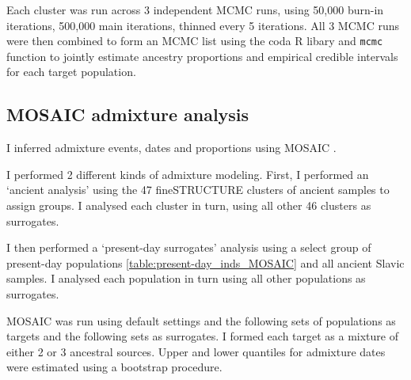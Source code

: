 Each cluster was run across 3 independent MCMC runs, using 50,000 burn-in iterations, 500,000 main iterations, thinned every 5 iterations. All 3 MCMC runs were then combined to form an MCMC list using the coda R libary \cite{oro22547} and \texttt{mcmc} function to jointly estimate ancestry proportions and empirical credible intervals for each target population. 

\subsection{MOSAIC admixture analysis}

I inferred admixture events, dates and proportions using  MOSAIC \cite{MOSAIC_2019}. 

I performed 2 different kinds of admixture modeling. First, I performed an `ancient analysis' using the 47 fineSTRUCTURE clusters of ancient samples to assign groups. I analysed each cluster in turn, using all other 46 clusters as surrogates. 

I then performed a `present-day surrogates' analysis using a select group of present-day populations \ref{table:present-day_inds_MOSAIC} and all ancient Slavic samples. I analysed each population in turn using all other populations as surrogates.  

MOSAIC was run using default settings and the following sets of populations as targets and the following sets as surrogates. I formed each target as a mixture of either 2 or 3 ancestral sources. Upper and lower quantiles for admixture dates were estimated using a bootstrap procedure. 

